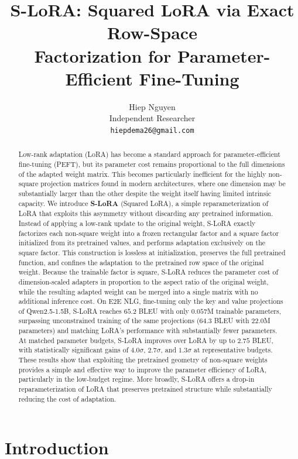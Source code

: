 \documentclass{article}
\title{S-LoRA: Squared LoRA via Exact Row-Space\\Factorization for
       Parameter-Efficient Fine-Tuning}
\author{Hiep Nguyen \\
Independent Researcher \\
\texttt{hiepdema26@gmail.com}
}
\theoremstyle{remark}
\begin{document}
\maketitle

\begin{abstract}
Low-rank adaptation (LoRA) has become a standard approach for parameter-efficient fine-tuning (PEFT), but its parameter cost remains proportional to the full dimensions of the adapted weight matrix. This becomes particularly inefficient for the highly non-square projection matrices found in modern architectures, where one dimension may be substantially larger than the other despite the weight itself having limited intrinsic capacity. We introduce \textbf{S-LoRA} (Squared LoRA), a simple reparameterization of LoRA that exploits this asymmetry without discarding any pretrained information. Instead of applying a low-rank update to the original weight, S-LoRA exactly factorizes each non-square weight into a frozen rectangular factor and a square factor initialized from its pretrained values, and performs adaptation exclusively on the square factor. This construction is lossless at initialization, preserves the full pretrained function, and confines the adaptation to the pretrained row space of the original weight. Because the trainable factor is square, S-LoRA reduces the parameter cost of dimension-scaled adapters in proportion to the aspect ratio of the original weight, while the resulting adapted weight can be merged into a single matrix with no additional inference cost. On E2E NLG, fine-tuning only the key and value projections of Qwen2.5-1.5B, S-LoRA reaches $65.2$ BLEU with only $0.057$M trainable parameters, surpassing unconstrained training of the same projections ($64.3$ BLEU with $22.0$M parameters) and matching LoRA's performance with substantially fewer parameters. At matched parameter budgets, S-LoRA improves over LoRA by up to $2.75$ BLEU, with statistically significant gains of $4.0\sigma$, $2.7\sigma$, and $1.3\sigma$ at representative budgets. These results show that exploiting the pretrained geometry of non-square weights provides a simple and effective way to improve the parameter efficiency of LoRA, particularly in the low-budget regime. More broadly, S-LoRA offers a drop-in reparameterization of LoRA that preserves pretrained structure while substantially reducing the cost of adaptation.
\end{abstract}

\section{Introduction}
\end{document}
